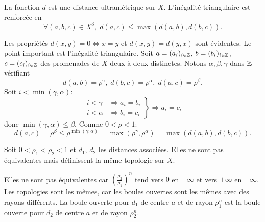 \begin{prop}
 La fonction $d$ est une distance ultramétrique sur $X$. L'inégalité triangulaire est renforcée en
 \begin{displaymath}
  \forall (a,b,c)\in X^3, \; d(a,c) \leq \max(d(a,b),d(b,c)).
 \end{displaymath}
\end{prop}
\begin{demo}
Les propriétés $d(x,y)=0 \Leftrightarrow x=y$ et $d(x,y)=d(y,x)$ sont évidentes. Le point important est l'inégalité triangulaire.\newline
Soit $a = (a_i)_{i \in \mathbb{Z}}$, $b = (b_i)_{i\in \mathbb{Z}}$, $c = (c_i)_{i \in \mathbb{Z}}$ des promenades de $X$ deux à deux distinctes. Notons $\alpha, \beta, \gamma$ dans $\mathbb{Z}$ vérifiant
\begin{displaymath}
 d(a,b) = \rho^\gamma, \; d(b,c) = \rho^\alpha, \; d(a,c) = \rho^\beta.
\end{displaymath}
Soit $i < \min(\gamma, \alpha)$:
\begin{displaymath}
 \left.
 \begin{aligned}
  i < \gamma &\Rightarrow a_i = b_i \\
  i < \alpha &\Rightarrow b_i = c_i
 \end{aligned}
 \right\rbrace
 \Rightarrow a_i = c_i
\end{displaymath}
donc $\min(\gamma,\alpha)\leq \beta$. Comme $0 <  \rho < 1$:
\begin{displaymath}
 d(a,c) = \rho^\beta \leq \rho^{\min(\gamma,\alpha)}= \max(\rho^\gamma, \rho^\alpha) = \max(d(a,b),d(b,c)).
\end{displaymath}
\end{demo}

\begin{propn}\label{Prop:PromIdemTopo}
  Soit $0 < \rho_1 < \rho_2 <1$ et $d_1$, $d_2$ les distances associées. Elles ne sont pas équivalentes mais définissent la même topologie sur $X$.
\end{propn}
\begin{demo}
Elles ne sont pas équivalentes car $(\frac{\rho_2}{\rho_1})^n$ tend vers $0$ en $-\infty$ et vers $+\infty$ en $+\infty$.\newline
Les topologies sont les mêmes, car les boules ouvertes sont les mêmes avec des rayons différents. La boule ouverte pour $d_1$ de centre $a$ et de rayon $\rho_1^n$ est la boule ouverte pour $d_2$ de centre $a$ et de rayon $\rho_2^n$.
\end{demo}


